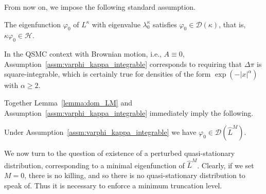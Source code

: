 \documentclass{aptpub}
\newcommand{\Dom}{\mathcal D}
\renewcommand{\H}{\mathcal H}
\begin{document}
From now on, we impose the following standard assumption.
\begin{assumption}
    The eigenfunction $\varphi_0$ of $L^\kappa$ with eigenvalue $\lambda_0^\kappa$ satisfies $\varphi_0 \in \Dom(\kappa)$, that is, $\kappa \varphi_0 \in \H$.
    \label{assm:varphi_kappa_integrable}
\end{assumption}
\begin{remark}
    In the QSMC context with Brownian motion, i.e., $A\equiv 0$, Assumption~\ref{assm:varphi_kappa_integrable} corresponds to requiring that $\Delta \pi$ is square-integrable, which is certainly true for densities of the form $\exp(-\vert x\vert^\alpha)$ with $\alpha \ge 2$.
\end{remark}
Together Lemma~\ref{lemma:dom_LM} and Assumption~\ref{assm:varphi_kappa_integrable} immediately imply the following.
\begin{lemma}
    Under Assumption~\ref{assm:varphi_kappa_integrable} we have $\varphi_0\in \Dom(\widehat{L}^M)$.
    \label{lemma:varphi0_domLM}
\end{lemma}
We now turn to the question of existence of a perturbed quasi-stationary distribution, corresponding to a minimal eigenfunction of $\widehat{L}^M$. Clearly, if we set $M=0$, there is no killing, and so there is no quasi-stationary distribution to speak of. Thus it is necessary to enforce a minimum truncation level.
\end{document}
